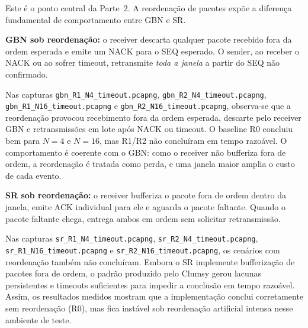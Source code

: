 \documentclass[10pt,a4paper]{article}
\begin{document}
Este é o ponto central da Parte~2. A reordenação de pacotes expõe a diferença
fundamental de comportamento entre GBN e SR.

\begin{table}[H]
\centering
\caption{Throughput (kbps) e retransmissões sob reordenação — $N=4$ e $N=16$.}
\label{tab:reorder}
\end{table}

\noindent\textbf{GBN sob reordenação:} o receiver descarta qualquer pacote recebido
fora da ordem esperada e emite um NACK para o SEQ esperado. O sender, ao receber o
NACK ou ao sofrer timeout, retransmite \emph{toda a janela} a partir do SEQ não
confirmado.

Nas capturas \texttt{gbn\_R1\_N4\_timeout.pcapng},
\texttt{gbn\_R2\_N4\_timeout.pcapng}, \texttt{gbn\_R1\_N16\_timeout.pcapng} e
\texttt{gbn\_R2\_N16\_timeout.pcapng}, observa-se que a reordenação provocou
recebimento fora da ordem esperada, descarte pelo receiver GBN e retransmissões
em lote após NACK ou timeout. O baseline R0 concluiu bem para $N=4$ e $N=16$,
mas R1/R2 não concluíram em tempo razoável. O comportamento é coerente com o
GBN: como o receiver não bufferiza fora de ordem, a reordenação é tratada como
perda, e uma janela maior amplia o custo de cada evento.

\noindent\textbf{SR sob reordenação:} o receiver bufferiza o pacote fora de ordem
dentro da janela, emite ACK individual para ele e aguarda o pacote faltante. Quando
o pacote faltante chega, entrega ambos em ordem sem solicitar retransmissão.

Nas capturas \texttt{sr\_R1\_N4\_timeout.pcapng},
\texttt{sr\_R2\_N4\_timeout.pcapng}, \texttt{sr\_R1\_N16\_timeout.pcapng} e
\texttt{sr\_R2\_N16\_timeout.pcapng}, os cenários com reordenação também não
concluíram. Embora o SR implemente bufferização de pacotes fora de ordem, o
padrão produzido pelo Clumsy gerou lacunas persistentes e timeouts suficientes
para impedir a conclusão em tempo razoável. Assim, os resultados medidos mostram
que a implementação conclui corretamente sem reordenação (R0), mas fica instável
sob reordenação artificial intensa nesse ambiente de teste.
\end{document}

